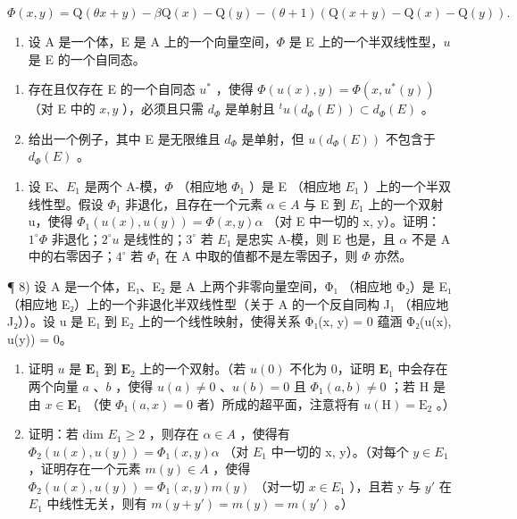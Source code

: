 \[
\Phi (x, y) = \mathrm{Q} (\theta x + y) - \beta \mathrm{Q} (x) - \mathrm{Q} (y) - (\theta + 1) (\mathrm{Q} (x + y) - \mathrm{Q} (x) - \mathrm{Q} (y)).
\]

\begin{enumerate}
\def\labelenumi{\arabic{enumi})}
\setcounter{enumi}{5}
\tightlist
\item
  设 A 是一个体，E 是 A 上的一个向量空间，\(\Phi\) 是 E 上的一个半双线性型，\(u\) 是 E 的一个自同态。
\end{enumerate}

\begin{enumerate}
\def\labelenumi{\alph{enumi})}
\item
  存在且仅存在 E 的一个自同态 \(u^*\) ，使得 \(\Phi(u(x), y) = \Phi(x, u^*(y))\) （对 E 中的 \(x, y\) ），必须且只需 \(d_\Phi\) 是单射且 \(^t u(d_\Phi(E)) \subset d_\Phi(E)\) 。
\item
  给出一个例子，其中 E 是无限维且 \(d_{\Phi}\) 是单射，但 \(u(d_{\Phi}(E))\) 不包含于 \(d_{\Phi}(E)\) 。
\end{enumerate}

\begin{enumerate}
\def\labelenumi{\arabic{enumi})}
\setcounter{enumi}{6}
\tightlist
\item
  设 E、\(E_{1}\) 是两个 A-模，\(\Phi\) （相应地 \(\Phi_{1}\) ）是 E （相应地 \(E_{1}\) ）上的一个半双线性型。假设 \(\Phi_{1}\) 非退化，且存在一个元素 \(\alpha\in A\) 与 E 到 \(E_{1}\) 上的一个双射 u，使得 \(\Phi_{1}(u(x), u(y))=\Phi(x,y)\alpha\) （对 E 中一切的 x, y）。证明：\(1^{\circ}\Phi\) 非退化；\(2^{\circ}u\) 是线性的；\(3^{\circ}\) 若 \(E_{1}\) 是忠实 A-模，则 E 也是，且 \(\alpha\) 不是 A 中的右零因子；\(4^{\circ}\) 若 \(\Phi_{1}\) 在 A 中取的值都不是左零因子，则 \(\Phi\) 亦然。
\end{enumerate}

¶ 8) 设 A 是一个体，E₁、E₂ 是 A 上两个非零向量空间，Φ₁ （相应地 Φ₂）是 E₁ （相应地 E₂）上的一个非退化半双线性型（关于 A 的一个反自同构 J₁ （相应地 J₂））。设 u 是 E₁ 到 E₂ 上的一个线性映射，使得关系 Φ₁(x, y) = 0 蕴涵 Φ₂(u(x), u(y)) = 0。

\begin{enumerate}
\def\labelenumi{\alph{enumi})}
\item
  证明 \(u\) 是 \(\mathbf{E}_{1}\) 到 \(\mathbf{E}_{2}\) 上的一个双射。（若 \(u(0)\) 不化为 0，证明 \(\mathbf{E}_{1}\) 中会存在两个向量 \(a\) 、\(b\) ，使得 \(u(a) \neq 0\) 、\(u(b) = 0\) 且 \(\Phi_{1}(a, b) \neq 0\) ；若 H 是由 \(x \in \mathbf{E}_{1}\) （使 \(\Phi_{1}(a, x) = 0\) 者）所成的超平面，注意将有 \(u(\mathrm{H}) = \mathrm{E}_{2}\) 。）
\item
  证明：若 dim \(E_{1} \geqslant 2\) ，则存在 \(\alpha \in A\) ，使得有 \(\Phi_{2}(u(x), u(y)) = \Phi_{1}(x, y) \alpha\) （对 \(E_{1}\) 中一切的 x, y）。（对每个 \(y \in E_{1}\) ，证明存在一个元素 \(m(y) \in A\) ，使得 \(\Phi_{2}(u(x), u(y)) = \Phi_{1}(x, y)m(y)\) （对一切 \(x \in E_{1}\) ），且若 y 与 \(y'\) 在 \(E_{1}\) 中线性无关，则有 \(m(y + y') = m(y) = m(y')\) 。）
\end{enumerate}

